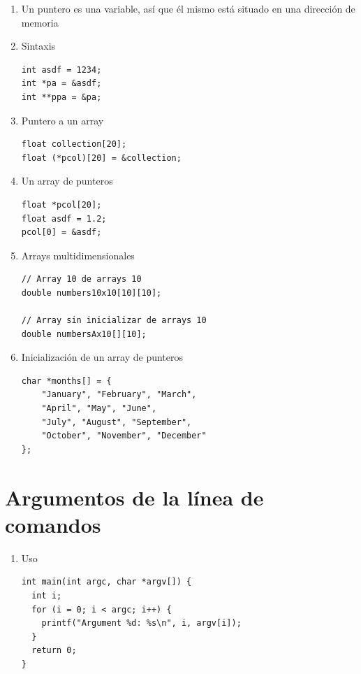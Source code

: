 \documentclass[a4paper,oneside]{article}
\begin{document}
  \begin{enumerate}
  \item Un puntero es una variable, así que él mismo está situado en una dirección de memoria

  \item Sintaxis

  \begin{verbatim}
int asdf = 1234;
int *pa = &asdf;
int **ppa = &pa;
  \end{verbatim}

  \item Puntero a un array

  \begin{verbatim}
float collection[20];
float (*pcol)[20] = &collection;
  \end{verbatim}

  \item Un array de punteros

  \begin{verbatim}
float *pcol[20];
float asdf = 1.2;
pcol[0] = &asdf;
  \end{verbatim}

  \item Arrays multidimensionales

  \begin{verbatim}
// Array 10 de arrays 10
double numbers10x10[10][10];

// Array sin inicializar de arrays 10
double numbersAx10[][10];
  \end{verbatim}

  \item Inicialización de un array de punteros

  \begin{verbatim}
char *months[] = {
    "January", "February", "March",
    "April", "May", "June",
    "July", "August", "September",
    "October", "November", "December"
};
  \end{verbatim}

  \end{enumerate}

\section{Argumentos de la línea de comandos}

  \begin{enumerate}
  
  \item Uso

  \begin{verbatim}
int main(int argc, char *argv[]) {
  int i;
  for (i = 0; i < argc; i++) {
    printf("Argument %d: %s\n", i, argv[i]);
  }
  return 0;
}
  \end{verbatim}

  \end{enumerate}
\end{document}

